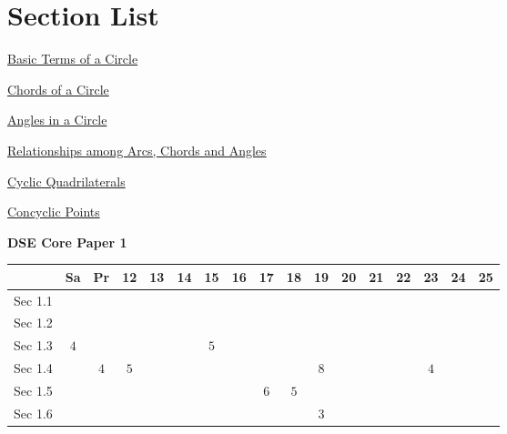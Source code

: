\documentclass[12pt, a4paper]{article}
\begin{document}
\section*{Section List}
\begin{enumx}[label=Sec 1.\arabic*\ ]
\item \hyperref[section:5-1-1]{Basic Terms of a Circle}
\item \hyperref[section:5-1-2]{Chords of a Circle}
\item \hyperref[section:5-1-3]{Angles in a Circle}
\item \hyperref[section:5-1-4]{Relationships among Arcs, Chords and Angles}
\item \hyperref[section:5-1-5]{Cyclic Quadrilaterals}
\item \hyperref[section:5-1-6]{Concyclic Points \NF}
\end{enumx}
\begin{absolutelynopagebreak}
\begin{center}
\textbf{DSE Core Paper 1}
\end{center}
\begin{center}
\begin{tabular}{|l|c|c|c|c|c|c|c|c|c|c|c|c|c|c|c|c|}
\hline
        & Sa & Pr & 12 & 13 & 14 & 15 & 16 & 17 & 18 & 19 & 20 & 21 & 22 & 23 & 24 & 25 \\\hline\hline
Sec 1.1 &  &  &  &  &  &  &  &  &  &  &  &  &  &  &  &  \\\hline
Sec 1.2 &  &  &  &  &  &  &  &  &  &  &  &  &  &  &  &  \\\hline
Sec 1.3 &  $4$ &  &  &  &  &  $5$ &  &  &  &  &  &  &  &  &  &  \\\hline
Sec 1.4 &  &  $4$ &  $5$ &  &  &  &  &  &  &  $8$ &  &  &  &  $4$ &  &  \\\hline
Sec 1.5 &  &  &  &  &  &  &  &  $6$ &  $5$ &  &  &  &  &  &  &  \\\hline
Sec 1.6 &  &  &  &  &  &  &  &  &  &  $3$ &  &  &  &  &  &  \\\hline
\end{tabular}
\end{center}
\end{absolutelynopagebreak}
\end{document}
